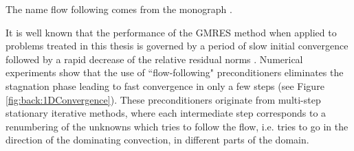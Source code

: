 The name flow following comes from the monograph \cite{ElmSilWat14}.

It is well known that the performance of the GMRES method \cite{Gre97} when
applied to problems treated in this thesis is governed by a period of slow initial convergence
followed by a rapid decrease of the relative residual norms \cite{LieStr03-2}.
Numerical experiments show that the use of ``flow-following" preconditioners
\cite{ElmSilWat14} eliminates the stagnation phase leading to fast convergence
in only a few steps (see Figure \ref{fig:back:1DConvergence}). These preconditioners
originate from multi-step stationary iterative methods, where each intermediate
step corresponds to a renumbering of the unknowns which tries to follow the
flow, i.e. tries to go in the direction of the dominating convection, in
different parts of the domain.

